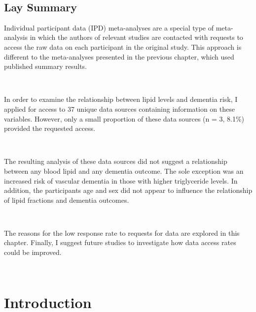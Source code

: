 \documentclass[a4paper, twoside]{templates/ociamthesis}
\begin{document}
~

\minitoc 

\begin{laybox}

\hypertarget{lay-summary-5}{%
\section*{Lay Summary}\label{lay-summary-5}}

Individual participant data (IPD) meta-analyses are a special type of meta-analysis
in which the authors of relevant studies are contacted with requests to access the raw data on each participant in the original study. This approach is different to the meta-analyses presented in the previous chapter, which used published summary results.

~

In order to examine the relationship between lipid levels and dementia risk, I applied for access to 37 unique data sources containing information on these variables. However, only a small proportion of these data sources (n = 3, 8.1\%) provided the requested access.

~

The resulting analysis of these data sources did not suggest a relationship between any blood lipid and any dementia outcome. The sole exception was an increased risk of vascular dementia in those with higher triglyceride levels. In addition, the participants age and sex did not appear to influence the relationship of lipid fractions and dementia outcomes.

~

The reasons for the low response rate to requests for data are explored in this chapter. Finally, I suggest future studies to investigate how data access rates could be improved.

\end{laybox}

~

\hypertarget{introduction-3}{%
\section{Introduction}\label{introduction-3}}
\end{document}
